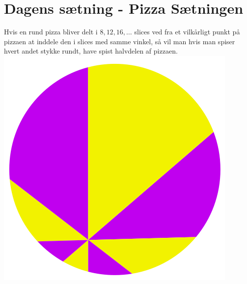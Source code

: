 \begin{minipage}[t]{100mm}
\section*{Dagens sætning - Pizza Sætningen}
Hvis en rund pizza bliver delt i $8, 12, 16, \dots$ slices ved fra et vilkårligt punkt på pizzaen at inddele den i slices med samme vinkel, så vil man hvis man spiser hvert andet stykke rundt, have spist halvdelen af pizzaen.
\includegraphics[width=\textwidth]{Pizzathm.png}
\end{minipage}
